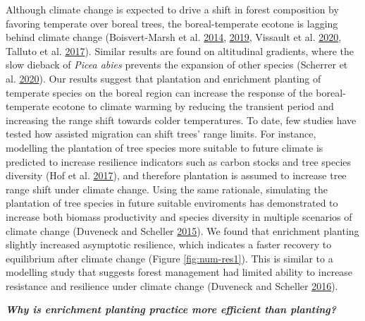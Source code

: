 \documentclass[12pt]{article}
\begin{document}
Although climate change is expected to drive a shift in forest
composition by favoring temperate over boreal trees, the
boreal-temperate ecotone is lagging behind climate change
(Boisvert-Marsh et al. \protect\hyperlink{ref-BoisvertMarsh2014}{2014},
\protect\hyperlink{ref-BoisvertMarsh2019}{2019}, Vissault et al.
\protect\hyperlink{ref-Vissault2020}{2020}, Talluto et al.
\protect\hyperlink{ref-Talluto2017}{2017}). Similar results are found on
altitudinal gradients, where the slow dieback of \emph{Picea abies}
prevents the expansion of other species (Scherrer et al.
\protect\hyperlink{ref-Scherrer2020}{2020}). Our results suggest that
plantation and enrichment planting of temperate species on the boreal
region can increase the response of the boreal-temperate ecotone to
climate warming by reducing the transient period and increasing the
range shift towards colder temperatures. To date, few studies have
tested how assisted migration can shift trees' range limits. For
instance, modelling the plantation of tree species more suitable to
future climate is predicted to increase resilience indicators such as
carbon stocks and tree species diversity (Hof et al.
\protect\hyperlink{ref-Hof2017}{2017}), and therefore plantation is
assumed to increase tree range shift under climate change. Using the
same rationale, simulating the plantation of tree species in future
suitable enviroments has demonstrated to increase both biomass
productivity and species diversity in multiple scenarios of climate
change (Duveneck and Scheller
\protect\hyperlink{ref-Duveneck2015}{2015}). We found that enrichment
planting slightly increased asymptotic resilience, which indicates a
faster recovery to equilibrium after climate change (Figure
\ref{fig:num-res1}). This is similar to a modelling study that suggests
forest management had limited ability to increase resistance and
resilience under climate change (Duveneck and Scheller
\protect\hyperlink{ref-Duveneck2016}{2016}).

\textbf{\emph{Why is enrichment planting practice more efficient than
planting?}}
\end{document}

